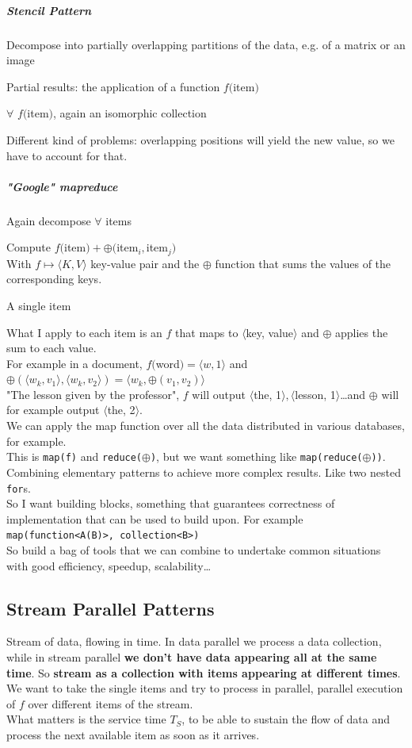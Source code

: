 \documentclass[10pt]{report}
\begin{document}
\subparagraph{Stencil Pattern} \begin{list}{}{}
	\item Decompose into partially overlapping partitions of the data, e.g. of a matrix or an image
	\item Partial results: the application of a function $f($item$)$
	\item $\forall$ $f($item$)$, again an isomorphic collection
\end{list}
Different kind of problems: overlapping positions will yield the new value, so we have to account for that.
\subparagraph{"Google" mapreduce}
\begin{list}{}{}
	\item Again decompose $\forall$ items
	\item Compute $f($item$) + \oplus($item$_i, $item$_j)$\\
	With $f\mapsto \langle K, V\rangle$ key-value pair and the $\oplus$ function that sums the values of the corresponding keys.
	\item A single item
\end{list}
What I apply to each item is an $f$ that maps to $\langle$key, value$\rangle$ and $\oplus$ applies the sum to each value.\\
For example in a document, $f($word$)=\langle w,1\rangle$ and $\oplus(\langle w_k,v_1\rangle,\langle w_k,v_2\rangle) = \langle w_k, \oplus(v_1,v_2)\rangle$\\
"The lesson given by the professor", $f$ will output $\langle$the, 1$\rangle,\langle$lesson, 1$\rangle$\ldots and $\oplus$ will for example output $\langle$the, 2$\rangle$.\\
We can apply the map function over all the data distributed in various databases, for example.\\
This is \texttt{map(f)} and \texttt{reduce($\oplus$)}, but we want something like \texttt{map(reduce($\oplus$))}. Combining elementary patterns to achieve more complex results. Like two nested \texttt{for}s.\\
So I want building blocks, something that guarantees correctness of implementation that can be used to build upon. For example \texttt{map(function<A(B)>, collection<B>)}\\
So build a bag of tools that we can combine to undertake common situations with good efficiency, speedup, scalability\ldots
\subsection{Stream Parallel Patterns}
Stream of data, flowing in time. In data parallel we process a data collection, while in stream parallel \textbf{we don't have data appearing all at the same time}. So \textbf{stream as a collection with items appearing at different times}. We want to take the single items and try to process in parallel, parallel execution of $f$ over different items of the stream.\\
What matters is the service time $T_S$, to be able to sustain the flow of data and process the next available item as soon as it arrives.
\end{document}
